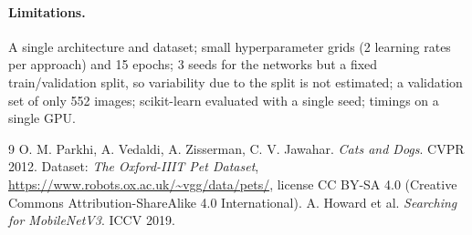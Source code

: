 \documentclass[11pt,a4paper]{article}
\begin{document}
\paragraph{Limitations.} A single architecture and dataset; small hyperparameter grids (2
learning rates per approach) and 15 epochs; 3 seeds for the networks but a fixed
train/validation split, so variability due to the split is not estimated; a validation set of
only 552 images; scikit-learn evaluated with a single seed; timings on a single GPU.

\begin{thebibliography}{9}
 O. M. Parkhi, A. Vedaldi, A. Zisserman, C. V. Jawahar.
\emph{Cats and Dogs}. CVPR 2012. Dataset: \emph{The Oxford-IIIT Pet Dataset},
\url{https://www.robots.ox.ac.uk/~vgg/data/pets/}, license CC BY-SA 4.0
(Creative Commons Attribution-ShareAlike 4.0 International).
 A. Howard et al. \emph{Searching for MobileNetV3}. ICCV 2019.
\end{thebibliography}
\end{document}
